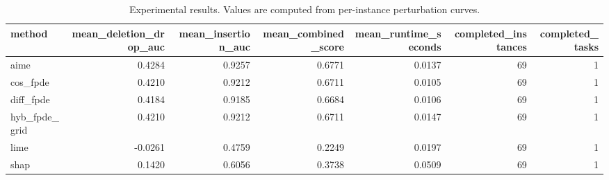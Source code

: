 \begin{table}[t]
\caption{Experimental results. Values are computed from per-instance perturbation curves.}
\label{tab:main_results_computed}
\centering
\begin{tabular}{lrrrrrr}
\toprule
method & mean\_deletion\_drop\_auc & mean\_insertion\_auc & mean\_combined\_score & mean\_runtime\_seconds & completed\_instances & completed\_tasks \\
\midrule
aime & 0.4284 & 0.9257 & 0.6771 & 0.0137 & 69 & 1 \\
cos\_fpde & 0.4210 & 0.9212 & 0.6711 & 0.0105 & 69 & 1 \\
diff\_fpde & 0.4184 & 0.9185 & 0.6684 & 0.0106 & 69 & 1 \\
hyb\_fpde\_grid & 0.4210 & 0.9212 & 0.6711 & 0.0147 & 69 & 1 \\
lime & -0.0261 & 0.4759 & 0.2249 & 0.0197 & 69 & 1 \\
shap & 0.1420 & 0.6056 & 0.3738 & 0.0509 & 69 & 1 \\
\bottomrule
\end{tabular}

\end{table}

